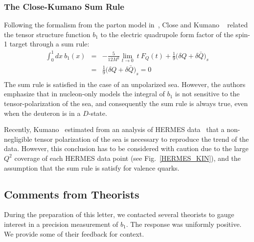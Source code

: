 \subsubsection{The Close-Kumano Sum Rule}
Following the formalism from the parton model in~\cite{Hoodbhoy:1988am}, Close and 
Kumano ~\cite{Close:1990zw} related the tensor structure function $b_1$ to the electric quadrupole 
form factor of the spin-1 target through a sum rule:
\begin{eqnarray}
\int_0^1 dx~b_1(x)  & = &  - \frac{5}{12 M^2} \lim_{t \rightarrow 0}~t~F_Q(t) 
                           + \frac{1}{9} \Big(\delta Q + \delta \bar{Q}\Big)_s \nonumber \\
                    & = & \frac{1}{9} \Big(\delta Q + \delta \bar{Q}\Big)_s  = 0 \nonumber \\
\label{cksum}
\end{eqnarray}
The sum rule is satisfied in the case of an unpolarized sea. However, the authors emphasize
that in nucleon-only models the integral of $b_1$ is not sensitive to the 
tensor-polarization of the sea, and consequently the sum rule is always true, even when the 
deuteron is in a $D$-state.

Recently, Kumano~\cite{Kumano:2010vz} estimated from an analysis of HERMES data~\cite{Airapetian:2005cb}
that a non-negligible tensor polarization of the sea is necessary to reproduce the trend of
the data. However, this conclusion has to be considered with caution due to the large
$Q^2$ coverage of each HERMES data point (see Fig.~\ref{HERMES_KIN}), and the assumption that 
the sum rule is satisfy for valence quarks.


%



\subsection{Comments from Theorists}
%
During the preparation of this letter, we contacted several theorists 
to gauge interest in a precision measurement of $b_1$.  The response was uniformly positive.  We 
provide some of their feedback for context.
%
%

